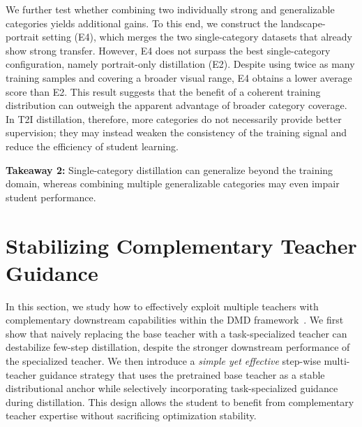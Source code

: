 \documentclass{llmxive}
\begin{document}
We further test whether combining two individually strong and generalizable categories yields additional gains. To this end, we construct the landscape-portrait setting (E4), which merges the two single-category datasets that already show strong transfer. However, E4 does not surpass the best single-category configuration, namely portrait-only distillation (E2). Despite using twice as many training samples and covering a broader visual range, E4 obtains a lower average score than E2. This result suggests that the benefit of a coherent training distribution can outweigh the apparent advantage of broader category coverage. In T2I distillation, therefore, more categories do not necessarily provide better supervision; they may instead weaken the consistency of the training signal and reduce the efficiency of student learning.

\begin{tcolorbox}[
colback=blue!3,
colframe=blue!70!black,
boxrule=0.8pt,
arc=6pt,
left=6pt,
right=6pt,
top=4pt,
bottom=4pt
]
\textbf{Takeaway 2:} Single-category distillation can generalize beyond the training domain, whereas combining multiple generalizable categories may even impair student performance.
\end{tcolorbox}





\section{Stabilizing Complementary Teacher Guidance}
In this section, we study how to effectively exploit multiple teachers with complementary downstream capabilities within the DMD framework~\citep{yin2024improved}. We first show that naively replacing the base teacher with a task-specialized teacher can destabilize few-step distillation, despite the stronger downstream performance of the specialized teacher. We then introduce a \textit{simple yet effective} step-wise multi-teacher guidance strategy that uses the pretrained base teacher as a stable distributional anchor while selectively incorporating task-specialized guidance during distillation. This design allows the student to benefit from complementary teacher expertise without sacrificing optimization stability.
\end{document}
